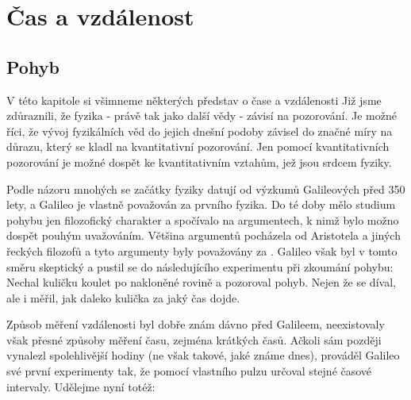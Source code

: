 \setchaptertoc
\chapter{Čas a vzdálenost}\label{fyz:IchapV}

  \section{Pohyb}
    V této kapitole si všimneme některých představ o čase a vzdálenosti Již jsme zdůraznili, že 
    fyzika - právě tak jako další vědy - závisí na pozorování. Je možné říci, že vývoj fyzikálních 
    věd do jejich dnešní podoby závisel do značné míry na důrazu, který se kladl na kvantitativní 
    pozorování. Jen pomocí kvantitativních pozorování je možné dospět ke kvantitativním vztahům, 
    jež jsou srdcem fyziky.
    
    Podle názoru mnohých se začátky fyziky datují od výzkumů Galileových před 350 lety, a Galileo 
    je vlastně považován za prvního fyzika. Do té doby mělo studium pohybu jen filozofický 
    charakter a spočívalo na argumentech, k nimž bylo možno dospět pouhým uvažováním. Většina 
    argumentů pocházela od Aristotela a jiných řeckých filozofů a tyto argumenty byly považovány za 
    . Galileo však byl v tomto směru skeptický a pustil se do následujícího 
    experimentu při zkoumání pohybu: Nechal kuličku koulet po nakloněné rovině a pozoroval pohyb. 
    Nejen že se díval, ale i měřil, jak daleko kulička za jaký čas dojde.
    
    
    Způsob měření vzdálenosti byl dobře znám dávno před Galileem, neexistovaly však přesné způsoby 
    měření času, zejména krátkých časů. Ačkoli sám později vynalezl spolehlivější hodiny (ne však 
    takové, jaké známe dnes), prováděl Galileo své první experimenty tak, že pomocí vlastního 
    pulzu určoval stejné časové intervaly. Udělejme nyní totéž:
    
